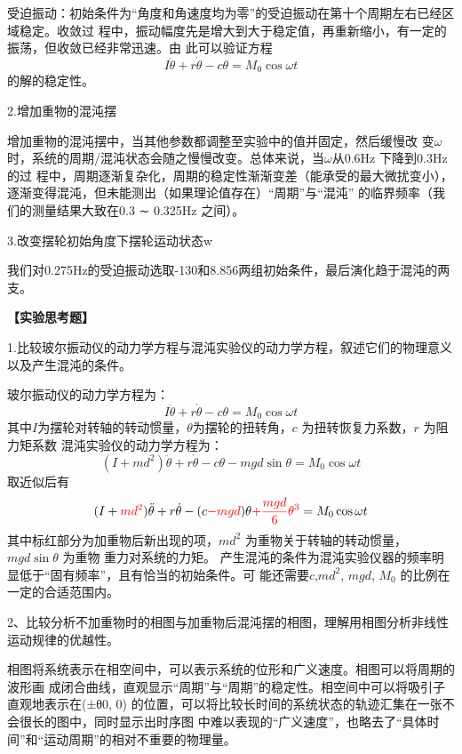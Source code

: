 \documentclass[dvipsnames, svgnames,a4paper,11pt]{article}
\begin{document}
受迫振动：初始条件为“角度和角速度均为零”的受迫振动在第十个周期左右已经区域稳定。收敛过
程中，振动幅度先是增大到大于稳定值，再重新缩小，有一定的振荡，但收敛已经非常迅速。由
此可以验证方程
$$I\ddot{\theta}+r\dot{\theta}-c\theta=M_0\cos\omega t$$
的解的稳定性。

2.增加重物的混沌摆

增加重物的混沌摆中，当其他参数都调整至实验中的值并固定，然后缓慢改
变$\omega$时，系统的周期/混沌状态会随之慢慢改变。总体来说，当$\omega$从0.6Hz 下降到0.3Hz 的过
程中，周期逐渐复杂化，周期的稳定性渐渐变差（能承受的最大微扰变小），逐渐变得混沌，但未能测出（如果理论值存在）“周期”与“混沌”
的临界频率（我们的测量结果大致在0.3 ∼ 0.325Hz 之间）。

3.改变摆轮初始角度下摆轮运动状态w

我们对0.275Hz的受迫振动选取-130和8.856两组初始条件，最后演化趋于混沌的两支。

\textbf{【实验思考题】}

1.比较玻尔振动仪的动力学方程与混沌实验仪的动力学方程，叙述它们的物理意义以及产生混沌的条件。

玻尔振动仪的动力学方程为：
$$I\ddot{\theta}+r\dot{\theta}-c\theta=M_0\cos\omega t$$
其中$I$为摆轮对转轴的转动惯量，$\theta$为摆轮的扭转角，$c$ 为扭转恢复力系数，$r$ 为阻力矩系数
混沌实验仪的动力学方程为：
$$(I+md^2)\ddot{\theta}+r\dot{\theta}-c\theta-mgd\sin\theta=M_0\cos\omega t$$
取近似后有
$$(I+{\color{red}md^2})\ddot{\theta}+r\dot{\theta}-(c{\color{red}-mgd})\theta{\color{red}+\frac{mgd}{6}\theta^3}=M_0\cos\omega t$$
其中标红部分为加重物后新出现的项，$md^2$ 为重物关于转轴的转动惯量，$mgd \sin \theta$ 为重物
重力对系统的力矩。
产生混沌的条件为混沌实验仪器的频率明显低于“固有频率”，且有恰当的初始条件。可
能还需要$c$,$ md^2$, $mgd$, $M_0$ 的比例在一定的合适范围内。

2、比较分析不加重物时的相图与加重物后混沌摆的相图，理解用相图分析非线性运动规律的优越性。

相图将系统表示在相空间中，可以表示系统的位形和广义速度。相图可以将周期的波形画
成闭合曲线，直观显示“周期”与“周期”的稳定性。相空间中可以将吸引子直观地表示在(±θ0, 0)
的位置，可以将比较长时间的系统状态的轨迹汇集在一张不会很长的图中，同时显示出时序图
中难以表现的“广义速度”，也略去了“具体时间”和“运动周期”的相对不重要的物理量。


\clearpage


\end{document}
